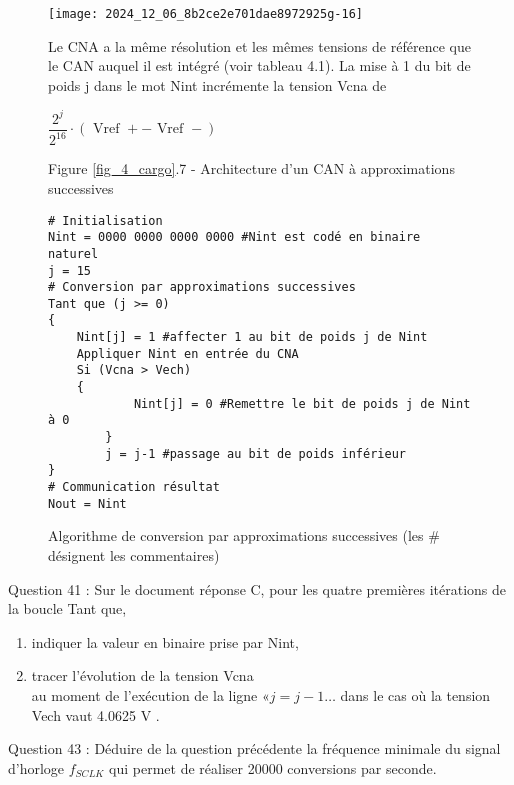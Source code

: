 \begin{figure}[!htb]
\begin{center}
\texttt{[image: 2024\_12\_06\_8b2ce2e701dae8972925g-16]}

Le CNA a la même résolution et les mêmes tensions de référence que le CAN auquel il est intégré (voir tableau 4.1). La mise à 1 du bit de poids j dans le mot Nint incrémente la tension Vcna de

$
\dfrac{2^{j}}{2^{16}} \cdot(\text { Vref }+- \text { Vref }-)
$

Figure \ref{fig_4_cargo}.7 - Architecture d'un CAN à approximations successives

\begin{verbatim}
# Initialisation
Nint = 0000 0000 0000 0000 #Nint est codé en binaire naturel
j = 15
# Conversion par approximations successives
Tant que (j >= 0)
{
    Nint[j] = 1 #affecter 1 au bit de poids j de Nint
    Appliquer Nint en entrée du CNA
    Si (Vcna > Vech)
    {
            Nint[j] = 0 #Remettre le bit de poids j de Nint à 0
        }
        j = j-1 #passage au bit de poids inférieur
}
# Communication résultat
Nout = Nint
\end{verbatim}
\caption{Algorithme de conversion par approximations successives (les \# désignent les commentaires) \label{fig12}}
\end{center}
\end{figure}

Question 41 : Sur le document réponse C, pour les quatre premières itérations de la boucle Tant que,

\begin{enumerate}
  \item indiquer la valeur en binaire prise par Nint,
  \item tracer l'évolution de la tension Vcna\\
au moment de l'exécution de la ligne \(« j=j-1 \ldots\) dans le cas où la tension Vech vaut 4.0625 V .
\end{enumerate}

\fi
{}

\ifprof
\begin{corrige}

\end{corrige}

\else
Question 43 : Déduire de la question précédente la fréquence minimale du signal d'horloge \(f_{S C L K}\) qui permet de réaliser 20000 conversions par seconde.

